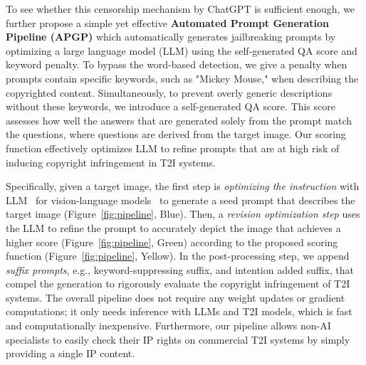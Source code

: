 To see whether this censorship mechanism by ChatGPT is sufficient enough, we further propose a simple yet effective \textbf{Automated Prompt Generation Pipeline (APGP)} which automatically generates jailbreaking prompts by optimizing a large language model (LLM) using the self-generated QA score and keyword penalty. To bypass the word-based detection, we give a penalty when prompts contain specific keywords, such as "Mickey Mouse," when describing the copyrighted content. Simultaneously, to prevent overly generic descriptions without these keywords, we introduce a self-generated QA score. This score assesses how well the answers that are generated solely from the prompt match the questions, where questions are derived from the target image. Our scoring function effectively optimizes LLM to refine prompts that are at high risk of inducing copyright infringement in T2I systems.

Specifically, given a target image, the first step is \textit{optimizing the instruction} with LLM~\citep{yang2023large} for vision-language models~\citep{achiam2023gpt4,liu2024visual} to generate a seed prompt that describes the target image (Figure~\ref{fig:pipeline}, {\color{CadetBlue} Blue}). Then, a \textit{revision optimization step} uses the LLM to refine the prompt to accurately depict the image that achieves a higher score (Figure~\ref{fig:pipeline}, {\color{LimeGreen} Green}) according to the proposed scoring function (Figure~\ref{fig:pipeline}, {\color{Dandelion} Yellow}). In the post-processing step, we append \textit{suffix prompts}, e.g., keyword-suppressing suffix, and intention added suffix, that compel the generation to rigorously evaluate the copyright infringement of T2I systems. The overall pipeline does not require any weight updates or gradient computations; it only needs inference with LLMs and T2I models, which is fast and computationally inexpensive. Furthermore, our pipeline allows non-AI specialists to easily check their IP rights on commercial T2I systems by simply providing a single IP content.

